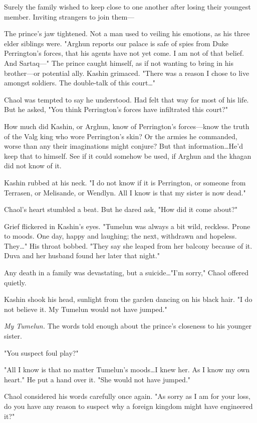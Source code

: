 Surely the family wished to keep close to one another after losing their youngest member.
Inviting strangers to join them---

The prince's jaw tightened.
Not a man used to veiling his emotions, as his three elder siblings were.
"Arghun reports our palace is safe of spies from Duke Perrington's forces, that his agents have not yet come.
I am not of that belief.
And Sartaq---" The prince caught himself, as if not wanting to bring in his brother---or potential ally.
Kashin grimaced.
"There was a reason I chose to live amongst soldiers.
The double-talk of this court\ldots"

Chaol was tempted to say he understood.
Had felt that way for most of his life.
But he asked, "You think Perrington's forces have infiltrated this court?"

How much did Kashin, or Arghun, know of Perrington's forces---know the truth of the Valg king who wore Perrington's skin?
Or the armies he commanded, worse than any their imaginations might conjure?
But that information\ldots He'd keep that to himself.
See if it could somehow be used, if Arghun and the khagan did not know of it.

Kashin rubbed at his neck.
"I do not know if it is Perrington, or someone from Terrasen, or Melisande, or Wendlyn.
All I know is that my sister is now dead."

Chaol's heart stumbled a beat.
But he dared ask, "How did it come about?"

Grief flickered in Kashin's eyes.
"Tumelun was always a bit wild, reckless.
Prone to moods.
One day, happy and laughing; the next, withdrawn and hopeless.
They\ldots" His throat bobbed.
"They say she leaped from her balcony because of it.
Duva and her husband found her later that night."

Any death in a family was devastating, but a suicide\ldots "I'm sorry," Chaol offered quietly.

Kashin shook his head, sunlight from the garden dancing on his black hair.
"I do not believe it.
My Tumelun would not have jumped."

\emph{My Tumelun.} The words told enough about the prince's closeness to his younger sister.

"You suspect foul play?"

"All I know is that no matter Tumelun's moods\ldots I knew her.
As I know my own heart."
He put a hand over it.
"She would not have jumped."

Chaol considered his words carefully once again.
"As sorry as I am for your loss, do you have any reason to suspect why a foreign kingdom might have engineered it?"

